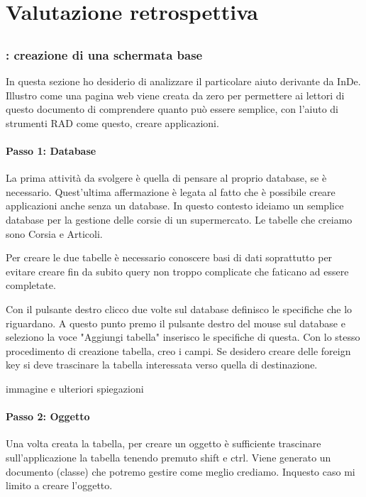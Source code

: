 \chapter{Valutazione retrospettiva}
\section{\inde}

\subsection{\inde: creazione di una schermata base}
In questa sezione ho desiderio di analizzare il particolare aiuto derivante da InDe. Illustro come una pagina web viene creata da zero per permettere ai lettori di questo documento di comprendere quanto può essere semplice, con l'aiuto di strumenti RAD come questo, creare applicazioni.

\subsubsection{Passo 1: Database}
La prima attività da svolgere è quella di pensare al proprio database, se è necessario. Quest'ultima affermazione è legata al fatto che è possibile creare applicazioni anche senza un database.
In questo contesto ideiamo un semplice database per la gestione delle corsie di un supermercato. Le tabelle che creiamo sono Corsia e Articoli.

Per creare le due tabelle è necessario conoscere basi di dati soprattutto per evitare creare fin da subito query non troppo complicate che faticano ad essere completate. 

Con il pulsante destro clicco due volte sul database definisco le specifiche che lo riguardano. A questo punto premo il pulsante destro del mouse sul database e seleziono la voce "Aggiungi tabella" inserisco le specifiche di questa. Con lo stesso procedimento di creazione tabella, creo i campi.
Se desidero creare delle foreign key si deve trascinare la tabella interessata verso quella di destinazione.  

\todo immagine e ulteriori spiegazioni

\subsubsection{Passo 2: Oggetto}
Una volta creata la tabella, per creare un oggetto è sufficiente trascinare sull'applicazione la tabella tenendo premuto shift e ctrl. Viene generato un documento (classe) che potremo gestire come meglio crediamo. Inquesto caso mi limito a creare l'oggetto.


